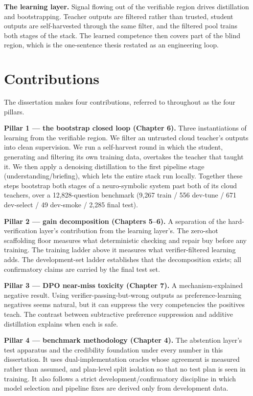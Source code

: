 \textbf{The learning layer.} Signal flowing out of the verifiable region drives distillation and bootstrapping. Teacher outputs are filtered rather than trusted, student outputs are self-harvested through the same filter, and the filtered pool trains both stages of the stack. The learned competence then covers part of the blind region, which is the one-sentence thesis restated as an engineering loop.

\section{Contributions}\label{sec:contributions}

The dissertation makes four contributions, referred to throughout as the four pillars.

\textbf{Pillar 1 --- the bootstrap closed loop (Chapter 6).} Three instantiations of learning from the verifiable region. We filter an untrusted cloud teacher's outputs into clean supervision. We run a self-harvest round in which the student, generating and filtering its own training data, overtakes the teacher that taught it. We then apply a denoising distillation to the first pipeline stage (understanding/briefing), which lets the entire stack run locally. Together these steps bootstrap both stages of a neuro-symbolic system past both of its cloud teachers, over a 12,828-question benchmark (9,267 train / 556 dev-tune / 671 dev-select / 49 dev-smoke / 2,285 final test).

\textbf{Pillar 2 --- gain decomposition (Chapters 5--6).} A separation of the hard-verification layer's contribution from the learning layer's. The zero-shot scaffolding floor measures what deterministic checking and repair buy before any training. The training ladder above it measures what verifier-filtered learning adds. The development-set ladder establishes that the decomposition exists; all confirmatory claims are carried by the final test set.

\textbf{Pillar 3 --- DPO near-miss toxicity (Chapter 7).} A mechanism-explained negative result. Using verifier-passing-but-wrong outputs as preference-learning negatives seems natural, but it can suppress the very competencies the positives teach. The contrast between subtractive preference suppression and additive distillation explains when each is safe.

\textbf{Pillar 4 --- benchmark methodology (Chapter 4).} The abstention layer's test apparatus and the credibility foundation under every number in this dissertation. It uses dual-implementation oracles whose agreement is measured rather than assumed, and plan-level split isolation so that no test plan is seen in training. It also follows a strict development/confirmatory discipline in which model selection and pipeline fixes are derived only from development data.

